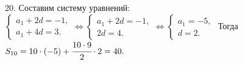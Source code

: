 20. Составим систему уравнений: $\begin{cases}a_1+2d=-1,\\a_1+4d=3.\end{cases}\Leftrightarrow\begin{cases}a_1+2d=-1,\\2d=4.\end{cases}
\Leftrightarrow\begin{cases}a_1=-5,\\d=2.\end{cases}$ Тогда $S_{10}=10\cdot\left(-5\right)+\cfrac{10\cdot9}{2}\cdot2=40.$\\
